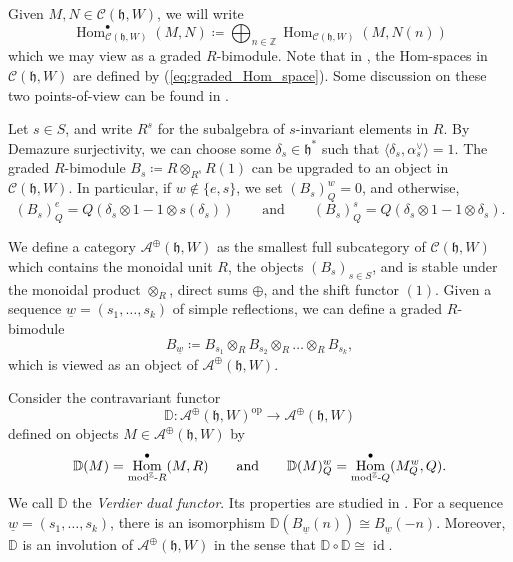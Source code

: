 \documentclass{amsart}
\newcommand{\Z}{\mathbb{Z}}
\newcommand{\scrC}{\mathcal{C}}
\newcommand{\scrA}{\mathcal{A}}
\newcommand{\uw}{\underline{w}}
\DeclareMathOperator{\Hom}{Hom}
\newcommand{\fr}[1]{\mathfrak{#1}}
\DeclareMathOperator{\op}{op}
\DeclareMathOperator{\id}{id}
\newcommand{\DD}{\mathbb{D}}
\theoremstyle{definition}
\begin{document}
        Given $M, N \in \scrC (\fr{h}, W)$, we will write
        \begin{equation}\label{eq:graded_Hom_space}
                \Hom_{\scrC (\fr{h}, W)}^{\bullet} (M, N) \coloneq \bigoplus_{n \in \Z} \Hom_{\scrC (\fr{h}, W)} (M,N (n))
        \end{equation}
        which we may view as a graded $R$-bimodule.   
        Note that in \cite{Abe19}, the Hom-spaces in $\scrC (\fr{h}, W)$ are defined by (\ref{eq:graded_Hom_space}). Some discussion on these two points-of-view can be found in \cite[\S2]{ARV}.

        Let $s \in S$, and write $R^s$ for the subalgebra of $s$-invariant elements in $R$. 
        By Demazure surjectivity, we can choose some $\delta_s \in \fr{h}^*$ such that $\langle \delta_s, \alpha_s^{\vee} \rangle = 1$.
        The graded $R$-bimodule $B_s \coloneq R \otimes_{R^s} R (1)$ can be upgraded to an object in $\scrC (\fr{h}, W)$. In particular, if $w \notin \{e,s\}$, we set $(B_s)_Q^w = 0$, and otherwise, 
        \[(B_s)_Q^e = Q (\delta_s \otimes 1 - 1 \otimes s(\delta_s)) \qquad\text{and}\qquad (B_s)_Q^s = Q (\delta_s \otimes 1 - 1 \otimes \delta_s).\]
        
        We define a category $\scrA^{\oplus} (\fr{h}, W)$ as the smallest full subcategory of $\scrC (\fr{h}, W)$ which contains the monoidal unit $R$, the objects $(B_s)_{s \in S}$, and is stable under the monoidal product $\otimes_R$, direct sums $\oplus$, and the shift functor $(1)$.
        Given a sequence $\uw = (s_1,\ldots, s_k)$ of simple reflections, we can define a graded $R$-bimodule
        \[B_{\uw} \coloneq B_{s_1} \otimes_R B_{s_2} \otimes_R \ldots \otimes_R B_{s_k},\]
        which is viewed as an object of $\scrA^{\oplus} (\fr{h}, W)$.

        Consider the contravariant functor
        \[\DD : \scrA^{\oplus} (\fr{h}, W)^{\op} \to \scrA^{\oplus} (\fr{h}, W)\]
        defined on objects $M \in \scrA^{\oplus} (\fr{h}, W)$ by
        \[\DD (M) = \Hom_{\textnormal{mod}^{\Z}\textnormal{-}R}^{\bullet} (M, R) \qquad\text{and}\qquad \DD(M)_Q^w = \Hom_{\textnormal{mod}^{\Z}\textnormal{-}Q}^{\bullet} (M_Q^w, Q).\]
        We call $\DD$ the \emph{Verdier dual functor}. Its properties are studied in \cite[\S 2.6]{Abe19}. 
        For a sequence $\uw = (s_1, \ldots, s_k)$, there is an isomorphism $\DD (B_{\uw} (n)) \cong B_{\uw} (-n)$. Moreover, $\DD$ is an involution of $\scrA^{\oplus} (\fr{h}, W)$ in the sense that $\DD \circ \DD \cong \id$.
\end{document}
